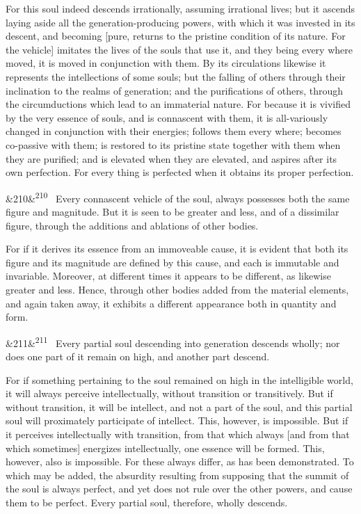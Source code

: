 \documentclass[12pt]{article}
\newcommand{\para}[1][]{\par\noindent\ifx&#1&\else\textsuperscript{\footnotesize #1}~\fi}
\begin{document}
For this soul indeed descends irrationally, assuming irrational lives; but it ascends laying aside all the generation-producing powers, with which it was invested in its descent, and becoming [pure, returns to the pristine condition of its nature. For the vehicle] imitates the lives of the souls that use it, and they being every where moved, it is moved in conjunction with them. By its circulations likewise it represents the intellections of some souls; but the falling of others through their inclination to the realms of generation; and the purifications of others, through the circumductions which lead to an immaterial nature. For because it is vivified by the very essence of souls, and is connascent with them, it is all-variously changed in conjunction with their energies; follows them every where; becomes co-passive with them; is restored to its pristine state together with them when they are purified; and is elevated when they are elevated, and aspires after its own perfection. For every thing is perfected when it obtains its proper perfection.

\para[210] Every connascent vehicle of the soul, always possesses both the same figure and magnitude. But it is seen to be greater and less, and of a dissimilar figure, through the additions and ablations of other bodies.

For if it derives its essence from an immoveable cause, it is evident that both its figure and its magnitude are defined by this cause, and each is immutable and invariable. Moreover, at different times it appears to be different, as likewise greater and less. Hence, through other bodies added from the material elements, and again taken away, it exhibits a different appearance both in quantity and form.

\para[211] Every partial soul descending into generation descends wholly; nor does one part of it remain on high, and another part descend.

For if something pertaining to the soul remained on high in the intelligible world, it will always perceive intellectually, without transition or transitively. But if without transition, it will be intellect, and not a part of the soul, and this partial soul will proximately participate of intellect. This, however, is impossible. But if it perceives intellectually with transition, from that which always [and from that which sometimes] energizes intellectually, one essence will be formed. This, however, also is impossible. For these always differ, as has been demonstrated. To which may be added, the absurdity resulting from supposing that the summit of the soul is always perfect, and yet does not rule over the other powers, and cause them to be perfect. Every partial soul, therefore, wholly descends.
\end{document}
